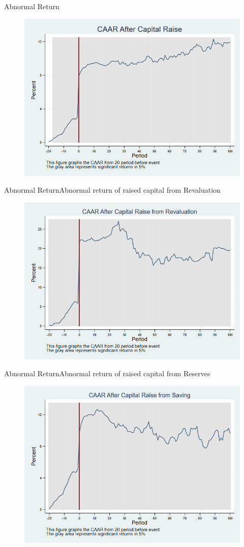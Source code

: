 \documentclass{beamer}
\begin{document}
	\begin{frame}{Abnormal Return}
		\label{car_withoutalpha}
		\begin{figure}
			\centering
			\includegraphics[width=0.7\linewidth]{Output/car_withoutalpha.png}
			\label{fig:car_withoutalpha}
		\end{figure}
	\end{frame}
	
	\begin{frame}{Abnormal Return}{Abnormal return of raised capital from Revaluation}
		\label{car_withoutalphaRevaluation}
		\begin{figure}
			\centering
			\includegraphics[width=0.65\linewidth]{Output/car_withoutalphaRevaluation.png}
			\label{fig:car_withoutalphaRevaluation}
		\end{figure}
		
		
	\end{frame}
	
	
	\begin{frame}{Abnormal Return}{Abnormal return of raised capital from Reserves}
		\label{car_withoutalphaSaving}
		\begin{figure}
			\centering
			\includegraphics[width=0.65\linewidth]{Output/car_withoutalphaSaving.png}
			\label{fig:car_withoutalphaSaving}
		\end{figure}
	\end{frame}
	
\end{document}
